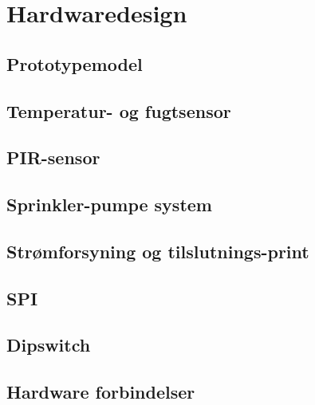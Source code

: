 \chapter{Hardwaredesign}

\section{Prototypemodel}


\section{Temperatur- og fugtsensor}


\section{PIR-sensor}


\section{Sprinkler-pumpe system}


\section{Strømforsyning og tilslutnings-print}


\section{SPI}


\section{Dipswitch}


\section{Hardware forbindelser}
